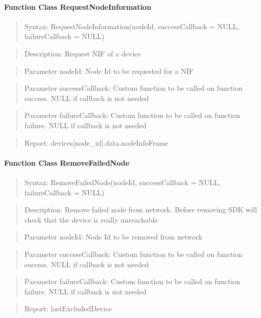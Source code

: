 \paragraph{Function Class RequestNodeInformation}
\begin{quote}Syntax: RequestNodeInformation(nodeId, successCallback = NULL, failureCallback = NULL)\end{quote}
\begin{quote}Description: Request NIF of a device\end{quote}
\begin{quote}Parameter nodeId: Node Id to be requested for a NIF\end{quote}
\begin{quote}Parameter successCallback: Custom function to be called on function success. NULL if callback is not needed\end{quote}
\begin{quote}Parameter failureCallback: Custom function to be called on function failure. NULL if callback is not needed\end{quote}
\begin{quote}Report: devices[node\_id].data.nodeInfoFrame\end{quote}

\paragraph{Function Class RemoveFailedNode}
\begin{quote}Syntax: RemoveFailedNode(nodeId, successCallback = NULL, failureCallback = NULL)\end{quote}
\begin{quote}Description: Remove failed node from network. Before removing SDK will check that the device is really unreachable\end{quote}
\begin{quote}Parameter nodeId: Node Id to be removed from network\end{quote}
\begin{quote}Parameter successCallback: Custom function to be called on function success. NULL if callback is not needed\end{quote}
\begin{quote}Parameter failureCallback: Custom function to be called on function failure. NULL if callback is not needed\end{quote}
\begin{quote}Report: lastExcludedDevice\end{quote}

